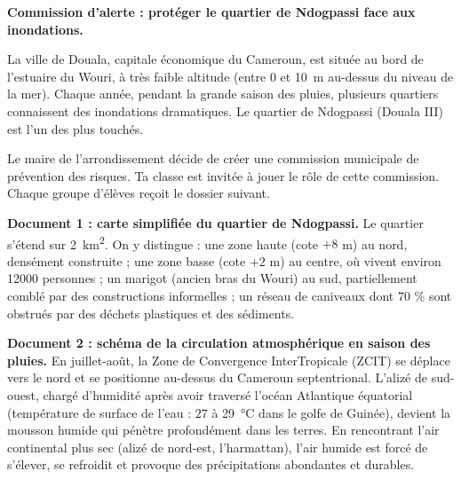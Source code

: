 \documentclass[11pt]{article}
\newcommand{\cle}[1]{{\popxbold\color{popdark}#1}}
\newcounter{popsec}
\newcounter{popsub}
\newcommand{\courssub}[1]{%
  \stepcounter{popsub}%
  \par\vspace{9pt}\noindent{\popxbold\fontsize{11.5}{13}\selectfont\color{popink}{\color{poporange}\thepopsec.\thepopsub}\hspace{6pt}#1}\par\nopagebreak\vspace{4pt}
}
\begin{document}
\courssub{Situation}

\textbf{Commission d'alerte : protéger le quartier de Ndogpassi face aux inondations.}

La ville de Douala, capitale économique du Cameroun, est située au bord de l'estuaire du Wouri, à très faible altitude (entre 0 et \SI{10}{m} au-dessus du niveau de la mer). Chaque année, pendant la grande saison des pluies, plusieurs quartiers connaissent des inondations dramatiques. Le quartier de Ndogpassi (Douala III) est l'un des plus touchés.

Le maire de l'arrondissement décide de créer une \cle{commission municipale de prévention des risques}. Ta classe est invitée à jouer le rôle de cette commission. Chaque groupe d'élèves reçoit le dossier suivant.

\textbf{Document 1 : carte simplifiée du quartier de Ndogpassi.} Le quartier s'étend sur \SI{2}{km^2}. On y distingue : une zone haute (cote $+8$ m) au nord, densément construite ; une zone basse (cote $+2$ m) au centre, où vivent environ \num{12000} personnes ; un marigot (ancien bras du Wouri) au sud, partiellement comblé par des constructions informelles ; un réseau de caniveaux dont 70 \% sont obstrués par des déchets plastiques et des sédiments.

\textbf{Document 2 : schéma de la circulation atmosphérique en saison des pluies.} En juillet-août, la \cle{Zone de Convergence InterTropicale} (ZCIT) se déplace vers le nord et se positionne au-dessus du Cameroun septentrional. L'\cle{alizé de sud-ouest}, chargé d'humidité après avoir traversé l'océan Atlantique équatorial (température de surface de l'eau : $27$ à \SI{29}{\celsius} dans le golfe de Guinée), devient la \cle{mousson humide} qui pénètre profondément dans les terres. En rencontrant l'air continental plus sec (alizé de nord-est, l'harmattan), l'air humide est forcé de s'élever, se refroidit et provoque des précipitations abondantes et durables.
\end{document}
